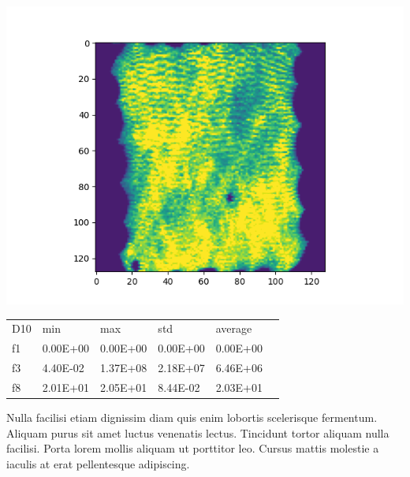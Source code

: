 {
\setlength{\columnsep}{30pt}
\begin{multicols*}{2}
{
    \begin{tikzfigure}
    \label{fig:fig1}
     \includegraphics[width=0.5\colwidth-75pt]{Figure/7100_0.png}
    \end{tikzfigure}
}
\pagebreak
{
\begin{tikztable}
    \begin{tabular}{llllll}
        D10 & min      & max      & std      & average  \\
        f1  & 0.00E+00 & 0.00E+00 & 0.00E+00 & 0.00E+00 \\
        f3  & 4.40E-02 & 1.37E+08 & 2.18E+07 & 6.46E+06 \\
        f8  & 2.01E+01 & 2.05E+01 & 8.44E-02 & 2.03E+01 \\
    \end{tabular}
\end{tikztable}

\vspace{5pt}

Nulla facilisi etiam dignissim diam quis enim lobortis scelerisque fermentum. Aliquam purus sit amet luctus venenatis lectus. Tincidunt tortor aliquam nulla facilisi. Porta lorem mollis aliquam ut porttitor leo. Cursus mattis molestie a iaculis at erat pellentesque adipiscing\cite{C03}.
}
\end{multicols*}
}

{
    \printbibliography[heading=none]
}